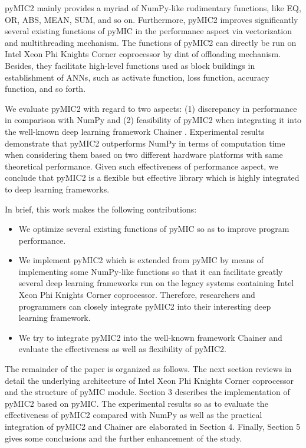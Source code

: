 pyMIC2 mainly provides a myriad of NumPy-like rudimentary functions, like EQ, OR, ABS, MEAN, SUM, and so on. Furthermore, pyMIC2 improves significantly several existing functions of pyMIC in the performance aspect via vectorization and multithreading mechanism. The functions of pyMIC2 can directly be run on Intel Xeon Phi Knights Corner coprocessor by dint of offloading mechanism. Besides, they facilitate high-level functions used as block buildings in establishment of ANNs, such as activate function, loss function, accuracy function, and so forth.

We evaluate pyMIC2 with regard to two aspects: (1) discrepancy in performance in comparison with NumPy and (2) feasibility of pyMIC2 when integrating it into the well-known deep learning framework Chainer \cite{Chainer,tokui2015chainer}. Experimental results demonstrate that pyMIC2 outperforms NumPy in terms of computation time when considering them based on two different hardware platforms with same theoretical performance. Given such effectiveness of performance aspect, we conclude that pyMIC2 is a flexible but effective library which is highly integrated to deep learning frameworks.

In brief, this work makes the following contributions:
\begin{itemize}
\item We optimize several existing functions of pyMIC so as to improve program performance.
\item We implement pyMIC2 which is extended from pyMIC by means of implementing some NumPy-like functions so that it can facilitate greatly several deep learning frameworks run on the legacy systems containing Intel Xeon Phi Knights Corner coprocessor. Therefore, researchers and programmers can closely integrate pyMIC2 into their interesting deep learning framework.
\item We try to integrate pyMIC2 into the well-known framework Chainer and evaluate the effectiveness as well as flexibility of pyMIC2.
\end{itemize}

The remainder of the paper is organized as follows. The next section reviews in detail the underlying architecture of Intel Xeon Phi Knights Corner coprocessor and the structure of pyMIC module. Section 3 describes the implementation of pyMIC2 based on pyMIC. The experimental results so as to evaluate the effectiveness of pyMIC2 compared with NumPy as well as the practical integration of pyMIC2 and Chainer are elaborated in Section 4. Finally, Section 5 gives some conclusions and the further enhancement of the study.